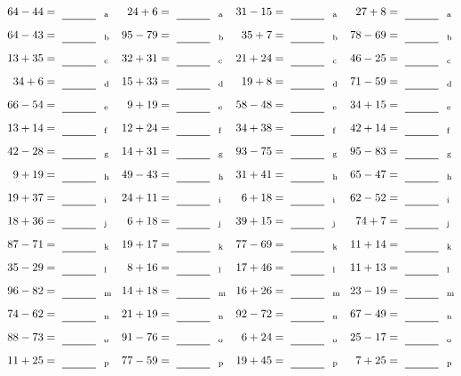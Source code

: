 \documentclass
[
  draft    = true,
  fontsize = 11pt,
  parskip  = half-
]
{scrartcl}
\begin{document}
\clearpage
\begin{align*}
    \pline{64-44}&=\rline{a}
  & \pline{24+6}&=\rline{a}
  & \pline{31-15}&=\rline{a}
  & \pline{27+8}&=\rline{a} \\[1ex]
    \pline{64-43}&=\rline{b}
  & \pline{95-79}&=\rline{b}
  & \pline{35+7}&=\rline{b}
  & \pline{78-69}&=\rline{b} \\[1ex]
    \pline{13+35}&=\rline{c}
  & \pline{32+31}&=\rline{c}
  & \pline{21+24}&=\rline{c}
  & \pline{46-25}&=\rline{c} \\[1ex]
    \pline{34+6}&=\rline{d}
  & \pline{15+33}&=\rline{d}
  & \pline{19+8}&=\rline{d}
  & \pline{71-59}&=\rline{d} \\[1ex]
    \pline{66-54}&=\rline{e}
  & \pline{9+19}&=\rline{e}
  & \pline{58-48}&=\rline{e}
  & \pline{34+15}&=\rline{e} \\[1ex]
    \pline{13+14}&=\rline{f}
  & \pline{12+24}&=\rline{f}
  & \pline{34+38}&=\rline{f}
  & \pline{42+14}&=\rline{f} \\[1ex]
    \pline{42-28}&=\rline{g}
  & \pline{14+31}&=\rline{g}
  & \pline{93-75}&=\rline{g}
  & \pline{95-83}&=\rline{g} \\[1ex]
    \pline{9+19}&=\rline{h}
  & \pline{49-43}&=\rline{h}
  & \pline{31+41}&=\rline{h}
  & \pline{65-47}&=\rline{h} \\[1ex]
    \pline{19+37}&=\rline{i}
  & \pline{24+11}&=\rline{i}
  & \pline{6+18}&=\rline{i}
  & \pline{62-52}&=\rline{i} \\[1ex]
    \pline{18+36}&=\rline{j}
  & \pline{6+18}&=\rline{j}
  & \pline{39+15}&=\rline{j}
  & \pline{74+7}&=\rline{j} \\[1ex]
    \pline{87-71}&=\rline{k}
  & \pline{19+17}&=\rline{k}
  & \pline{77-69}&=\rline{k}
  & \pline{11+14}&=\rline{k} \\[1ex]
    \pline{35-29}&=\rline{l}
  & \pline{8+16}&=\rline{l}
  & \pline{17+46}&=\rline{l}
  & \pline{11+13}&=\rline{l} \\[1ex]
    \pline{96-82}&=\rline{m}
  & \pline{14+18}&=\rline{m}
  & \pline{16+26}&=\rline{m}
  & \pline{23-19}&=\rline{m} \\[1ex]
    \pline{74-62}&=\rline{n}
  & \pline{21+19}&=\rline{n}
  & \pline{92-72}&=\rline{n}
  & \pline{67-49}&=\rline{n} \\[1ex]
    \pline{88-73}&=\rline{o}
  & \pline{91-76}&=\rline{o}
  & \pline{6+24}&=\rline{o}
  & \pline{25-17}&=\rline{o} \\[1ex]
    \pline{11+25}&=\rline{p}
  & \pline{77-59}&=\rline{p}
  & \pline{19+45}&=\rline{p}
  & \pline{7+25}&=\rline{p}
\end{align*}
\end{document}
